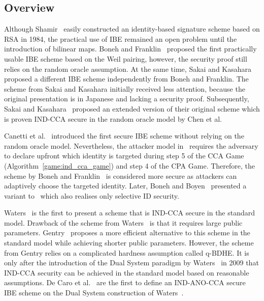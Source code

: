 \subsection{Overview}
\label{sec:evolution_of_ibe}
Although Shamir~\cite{art:Shamir84} easily constructed an identity-based signature scheme based on RSA in 1984, the practical use of IBE remained an open problem until the introduction of bilinear maps. Boneh and Franklin~\cite{art:BonehF01} proposed the first practically usable IBE scheme based on the Weil pairing, however, the security proof still relies on the random oracle assumption. At the same time, Sakai and Kasahara~\cite{art:SakaiOK01} proposed a different IBE scheme independently from Boneh and Franklin. The scheme from Sakai and Kasahara initially received less attention, because the original presentation is in Japanese and lacking a security proof. Subsequently, Sakai and Kasahara~\cite{art:SakaiK03} proposed an extended version of their original scheme which is proven IND-CCA secure in the random oracle model by Chen et al.~\cite{art:ChenC05} 

Canetti et al.~\cite{art:CanettiHK03} introduced the first secure IBE scheme without relying on the random oracle model. Nevertheless, the attacker model in~\cite{art:CanettiHK03} requires the adversary to declare upfront which identity \id{} is targeted during step 5 of the CCA Game (Algorithm~\ref{game:ind_cca_game}) and step 4 of the CPA Game. Therefore, the scheme by Boneh and Franklin~\cite{art:BonehF01} is considered more secure as attackers can adaptively choose the targeted identity. Later, Boneh and Boyen~\cite{art:BonehB04} presented a variant to~\cite{art:CanettiHK03} which also realises only selective ID security.

Waters~\cite{art:Waters05} is the first to present a scheme that is IND-CCA secure in the standard model. Drawback of the scheme from Waters~\cite{art:Waters05} is that it requires large public parameters. Gentry~\cite{art:Gentry06} proposes a more efficient alternative to this scheme in the standard model while achieving shorter public parameters. However, the scheme from Gentry relies on a complicated hardness assumption called q-BDHE. It is only after the introduction of the Dual System paradigm by Waters~\cite{art:Waters09} in 2009 that IND-CCA security can be achieved in the standard model based on reasonable assumptions. De Caro et al.~\cite{art:CaroIP10} are the first to define an IND-ANO-CCA secure IBE scheme on the Dual System construction of Waters~\cite{art:Waters09}. %

